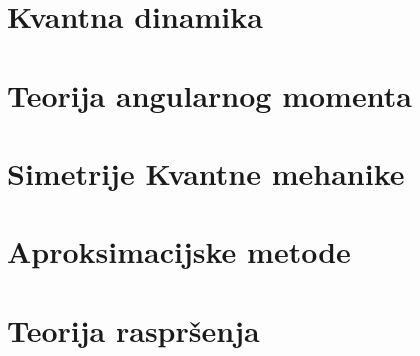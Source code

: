 \documentclass{article}
\numberwithin{equation}{section}
\begin{document}
\newpage
\section{Kvantna dinamika}

\newpage
\section{Teorija angularnog momenta}

\newpage
\section{Simetrije Kvantne mehanike}

\newpage
\section{Aproksimacijske metode}

\newpage
\section{Teorija raspršenja}
\end{document}
